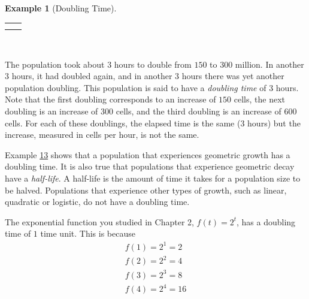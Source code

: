 \documentclass[10pt,]{book}
\theoremstyle{plain}
\theoremstyle{definition}
\theoremstyle{definition}
\newtheorem{example}[theorem]{Example}
\theoremstyle{definition}
\numberwithin{equation}{section}
\newlength{\panelmax}
\begin{document}
\begin{example}[Doubling Time]
{{{{}}}
\newlength{\phGtabular}\setlength{\phGtabular}{\ht\panelboxGtabular+\dp\panelboxGtabular}
\settototalheight{\phGtabular}{\usebox{\panelboxGtabular}}
\setlength{\panelmax}{\maxof{\panelmax}{\phGtabular}}
\leavevmode%
\setlength{\tabcolsep}{0\textwidth}
\par\medskip\noindent
\begin{tabular}{@{}*{2}{c}@{}}
\begin{minipage}[c][\panelmax][t]{0.5\textwidth}\usebox{\panelboxFtabular}\end{minipage}&
\begin{minipage}[c][\panelmax][t]{0.5\textwidth}\usebox{\panelboxGtabular}\end{minipage}\tabularnewline
\parbox[t]{0.5\textwidth}{
}&
\parbox[t]{0.5\textwidth}{
}\end{tabular}\\
}%
\par
The population took about \(3\) hours to double from \(150\) to \(300\) million.  In another \(3\) hours, it had doubled again, and in another \(3\) hours there was yet another population doubling. This population is said to have a \emph{doubling time} of \(3\) hours. Note that the first doubling corresponds to an increase of \(150\) cells, the next doubling is an increase of \(300\) cells, and the third doubling is an increase of \(600\) cells. For each of these doublings, the elapsed time is the same (\(3\) hours) but the increase, measured in cells per hour, is not the same.%
\end{example}
Example \hyperref[example-doubling-time]{13} shows that a population that experiences geometric growth has a doubling time. It is also true that populations that experience geometric decay have a \emph{half-life}. A half-life is the amount of time it takes for a population size to be halved. Populations that experience other types of growth, such as linear, quadratic or logistic, do not have a doubling time.%
\par
The exponential function you studied in Chapter 2, \(f(t)=2^t\), has a doubling time of \(1\) time unit. This is because%
%
\begin{gather*}
f(1)=2^1=2\\
f(2)=2^2=4\\
f(3)=2^3=8\\
f(4)=2^4=16
\end{gather*}
\end{document}
